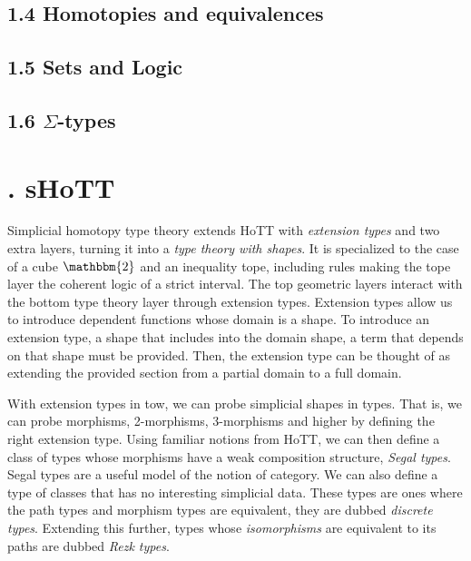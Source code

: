 \documentclass{article}
\theoremstyle{named}
\theoremstyle{remark}
\theoremstyle{definition}
\begin{document}
\subsection*{1.4 Homotopies and equivalences}



\subsection*{1.5 Sets and Logic}


\subsection*{1.6 $\Sigma$-types}


\newpage

\section*{. sHoTT}
\setcounter{section}{2}
\setcounter{equation}{0}
\setcounter{theorem}{0}
\setcounter{subsection}{1}

Simplicial homotopy type theory extends HoTT with \textit{extension types} and two extra layers, turning it into a
 \textit{type theory with shapes}. It is specialized to the case of a cube $\mathbbm{2}$ and an inequality tope, including rules making the tope layer the coherent logic of a strict interval. The top geometric layers interact with the bottom type theory layer
 through extension types. Extension types allow us to introduce dependent functions whose domain is a shape. To introduce an extension type, a shape that includes into the domain shape, a term that depends on that shape must be provided. Then, the extension
 type can be thought of as extending the provided section from a partial domain to a full domain. 

 With extension types in tow, we can probe simplicial shapes in types. That is, we can probe morphisms, 2-morphisms, 3-morphisms and higher by defining the right extension type. Using familiar notions from HoTT, we can then define a class of types whose morphisms have a weak composition structure, \textit{Segal types}. Segal types are a useful model of the notion of category. We can also define a type of classes that has no interesting simplicial data. These types are ones where the path types and morphism types are equivalent, they are dubbed \textit{discrete types}. Extending this further, types whose \textit{isomorphisms} are equivalent to its paths are dubbed \textit{Rezk types}. 
\end{document}
